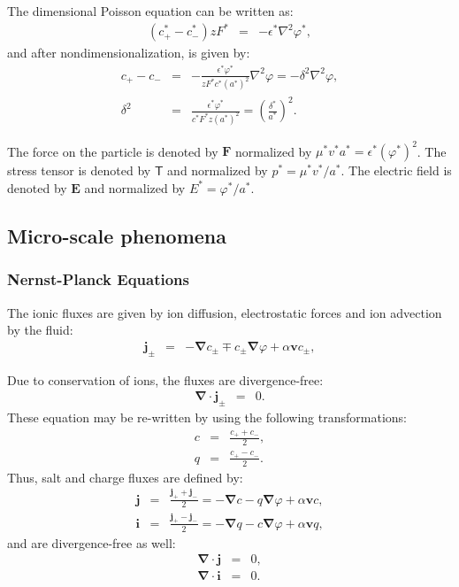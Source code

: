 \documentclass[final]{elsarticle}
\newcommand\eps \epsilon
\newcommand{\pars}[1]{\left(#1\right)}
\newcommand\Laplacian{\nabla^2}
\newcommand\bnabla{\boldsymbol{\nabla}}
\newcommand\bv{\boldsymbol{v}}
\newcommand\bE{\boldsymbol{E}}
\newcommand\bj{\boldsymbol{j}}
\newcommand\bi{\boldsymbol{i}}
\newcommand\bF{\boldsymbol{F}}
\newcommand\tT{\mathsf{T}}
\begin{document}
The dimensional Poisson equation can be written as:
\begin{eqnarray*}
(c^*_+ - c^*_-) z F^* &=& -\eps^* \Laplacian \varphi^*,
\end{eqnarray*}
and after nondimensionalization, is given by:
\begin{eqnarray*}
c_+ - c_- &=& -\frac{\eps^* \varphi^*}{z F^* c^* (a^*)^2} \Laplacian \varphi = 
-\delta^2 \Laplacian \varphi,
\\
\delta^2 &=& \frac{\eps^* \varphi^*}{c^* F^* z (a^*)^2} = 
\pars{\frac{\delta^*}{a^*}}^2.
\end{eqnarray*}

The force on the particle is denoted by $\bF$ normalized by $\mu^* v^* a^* = \eps^* (\varphi^*)^2$.
The stress tensor is denoted by $\tT$ and normalized by $p^* = \mu^* v^* / a^*$.
The electric field is denoted by $\bE$ and normalized by $E^* = \varphi^* / a^*$.

\subsection{Micro-scale phenomena}

\subsubsection{Nernst-Planck Equations}
The ionic fluxes are given by ion diffusion, electrostatic forces and ion advection by the fluid:
\begin{eqnarray*}
  \bj_\pm &=& -\bnabla c_\pm \mp c_\pm \bnabla \varphi + \alpha \bv c_\pm,
\end{eqnarray*}

Due to conservation of ions, the fluxes are divergence-free:
\begin{eqnarray*}
\bnabla \cdot \bj_\pm &=& 0.
\end{eqnarray*}
These equation may be re-written by using the following transformations:
\begin{eqnarray*}
  c &=& \frac{c_+ + c_-}{2},\\
  q &=& \frac{c_+ - c_-}{2}.
\end{eqnarray*}
Thus, salt and charge fluxes are defined by:
\begin{eqnarray*}
  \bj &=& \frac{\bj_+ + \bj_-}{2} = -\bnabla c - q \bnabla \varphi + \alpha \bv c, \\
  \bi &=& \frac{\bj_+ - \bj_-}{2} = -\bnabla q - c \bnabla \varphi + \alpha \bv q,
\end{eqnarray*}
and are divergence-free as well:
\begin{eqnarray*}
\bnabla \cdot \bj &=& 0, \\
\bnabla \cdot \bi &=& 0. 
\end{eqnarray*}
\end{document}
